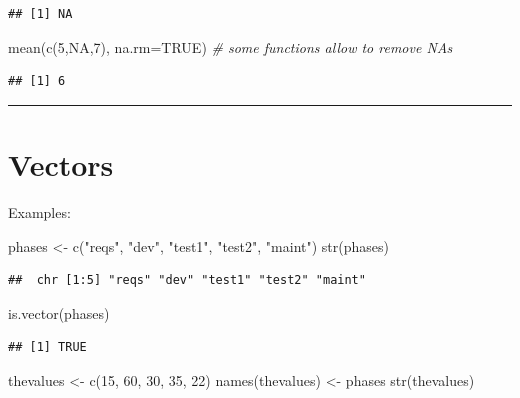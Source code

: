 \documentclass[
]{book}
\newenvironment{Shaded}{\begin{snugshade}}{\end{snugshade}}
\newcommand{\AttributeTok}[1]{\textcolor[rgb]{0.77,0.63,0.00}{#1}}
\newcommand{\CommentTok}[1]{\textcolor[rgb]{0.56,0.35,0.01}{\textit{#1}}}
\newcommand{\ConstantTok}[1]{\textcolor[rgb]{0.00,0.00,0.00}{#1}}
\newcommand{\DecValTok}[1]{\textcolor[rgb]{0.00,0.00,0.81}{#1}}
\newcommand{\FunctionTok}[1]{\textcolor[rgb]{0.00,0.00,0.00}{#1}}
\newcommand{\NormalTok}[1]{#1}
\newcommand{\OtherTok}[1]{\textcolor[rgb]{0.56,0.35,0.01}{#1}}
\newcommand{\StringTok}[1]{\textcolor[rgb]{0.31,0.60,0.02}{#1}}
\begin{document}
\begin{verbatim}
## [1] NA
\end{verbatim}

\begin{Shaded}
\begin{Highlighting}[]
\FunctionTok{mean}\NormalTok{(}\FunctionTok{c}\NormalTok{(}\DecValTok{5}\NormalTok{,}\ConstantTok{NA}\NormalTok{,}\DecValTok{7}\NormalTok{), }\AttributeTok{na.rm=}\ConstantTok{TRUE}\NormalTok{)  }\CommentTok{\# some functions allow to remove NAs}
\end{Highlighting}
\end{Shaded}

\begin{verbatim}
## [1] 6
\end{verbatim}

\begin{center}\rule{0.5\linewidth}{0.5pt}\end{center}

\hypertarget{vectors}{%
\section{Vectors}\label{vectors}}

Examples:

\begin{Shaded}
\begin{Highlighting}[]
\NormalTok{phases }\OtherTok{\textless{}{-}} \FunctionTok{c}\NormalTok{(}\StringTok{"reqs"}\NormalTok{, }\StringTok{"dev"}\NormalTok{, }\StringTok{"test1"}\NormalTok{, }\StringTok{"test2"}\NormalTok{, }\StringTok{"maint"}\NormalTok{)}
\FunctionTok{str}\NormalTok{(phases)}
\end{Highlighting}
\end{Shaded}

\begin{verbatim}
##  chr [1:5] "reqs" "dev" "test1" "test2" "maint"
\end{verbatim}

\begin{Shaded}
\begin{Highlighting}[]
\FunctionTok{is.vector}\NormalTok{(phases)}
\end{Highlighting}
\end{Shaded}

\begin{verbatim}
## [1] TRUE
\end{verbatim}

\begin{Shaded}
\begin{Highlighting}[]
\NormalTok{thevalues }\OtherTok{\textless{}{-}} \FunctionTok{c}\NormalTok{(}\DecValTok{15}\NormalTok{, }\DecValTok{60}\NormalTok{, }\DecValTok{30}\NormalTok{, }\DecValTok{35}\NormalTok{, }\DecValTok{22}\NormalTok{)}
\FunctionTok{names}\NormalTok{(thevalues) }\OtherTok{\textless{}{-}}\NormalTok{ phases}
\FunctionTok{str}\NormalTok{(thevalues)}
\end{Highlighting}
\end{Shaded}
\end{document}
